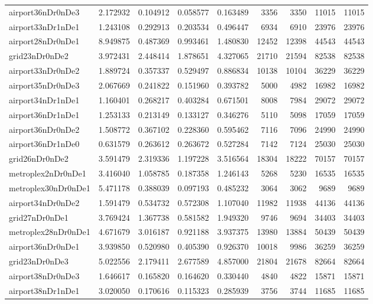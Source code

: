 \begin{longtable}{|l|r|r|r|r|r|r|r|r|}
airport36nDr0nDe3 & 2.172932 & 0.104912 & 0.058577 & 0.163489 & 3356 & 3350 & 11015 & 11015 \\
airport33nDr1nDe1 & 1.243108 & 0.292913 & 0.203534 & 0.496447 & 6934 & 6910 & 23976 & 23976 \\
airport28nDr0nDe1 & 8.949875 & 0.487369 & 0.993461 & 1.480830 & 12452 & 12398 & 44543 & 44543 \\
grid23nDr0nDe2 & 3.972431 & 2.448414 & 1.878651 & 4.327065 & 21710 & 21594 & 82538 & 82538 \\
airport33nDr0nDe2 & 1.889724 & 0.357337 & 0.529497 & 0.886834 & 10138 & 10104 & 36229 & 36229 \\
airport35nDr0nDe3 & 2.067669 & 0.241822 & 0.151960 & 0.393782 & 5000 & 4982 & 16982 & 16982 \\
airport34nDr1nDe1 & 1.160401 & 0.268217 & 0.403284 & 0.671501 & 8008 & 7984 & 29072 & 29072 \\
airport36nDr1nDe1 & 1.253133 & 0.213149 & 0.133127 & 0.346276 & 5110 & 5098 & 17059 & 17059 \\
airport36nDr0nDe2 & 1.508772 & 0.367102 & 0.228360 & 0.595462 & 7116 & 7096 & 24990 & 24990 \\
airport36nDr1nDe0 & 0.631579 & 0.263612 & 0.263672 & 0.527284 & 7142 & 7124 & 25030 & 25030 \\
grid26nDr0nDe2 & 3.591479 & 2.319336 & 1.197228 & 3.516564 & 18304 & 18222 & 70157 & 70157 \\
metroplex2nDr0nDe1 & 3.416040 & 1.058785 & 0.187358 & 1.246143 & 5268 & 5230 & 16535 & 16535 \\
metroplex30nDr0nDe1 & 5.471178 & 0.388039 & 0.097193 & 0.485232 & 3064 & 3062 & 9689 & 9689 \\
airport34nDr0nDe2 & 1.591479 & 0.534732 & 0.572308 & 1.107040 & 11982 & 11938 & 44136 & 44136 \\
grid27nDr0nDe1 & 3.769424 & 1.367738 & 0.581582 & 1.949320 & 9746 & 9694 & 34403 & 34403 \\
metroplex28nDr0nDe1 & 4.671679 & 3.016187 & 0.921188 & 3.937375 & 13980 & 13884 & 50439 & 50439 \\
airport36nDr0nDe1 & 3.939850 & 0.520980 & 0.405390 & 0.926370 & 10018 & 9986 & 36259 & 36259 \\
grid23nDr0nDe3 & 5.022556 & 2.179411 & 2.677589 & 4.857000 & 21804 & 21678 & 82664 & 82664 \\
airport38nDr0nDe3 & 1.646617 & 0.165820 & 0.164620 & 0.330440 & 4840 & 4822 & 15871 & 15871 \\
airport38nDr1nDe1 & 3.020050 & 0.170616 & 0.115323 & 0.285939 & 3756 & 3744 & 11685 & 11685 \\

\end{longtable}
